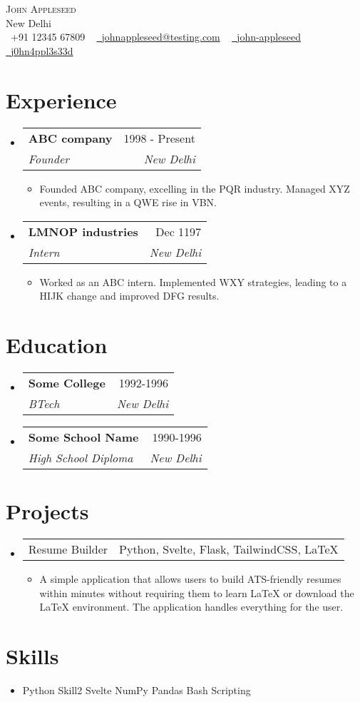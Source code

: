 \documentclass[11pt,a4paper]{article}
\makeatletter
\newcommand{\resumeItem}[1]{
  \item\small{
    {#1 \vspace{-2pt}}
  }
}
\newcommand{\resumeSubheading}[4]{
  \vspace{-2pt}\item
    \begin{tabular*}{0.97\textwidth}[t]{l@{\extracolsep{\fill}}r}
      \textbf{#1} & #2 \\
      \textit{\small#3} & \textit{\small #4} \\
    \end{tabular*}\vspace{-7pt}
}
\newcommand{\resumeProjectHeading}[2]{
    \item
    \begin{tabular*}{0.97\textwidth}{l@{\extracolsep{\fill}}r}
      \small#1 & #2 \\
    \end{tabular*}\vspace{-7pt}
}
\newcommand{\resumeSubHeadingListStart}{\begin{itemize}[leftmargin=0.15in, label={}]}
\newcommand{\resumeSubHeadingListEnd}{\end{itemize}}
\newcommand{\resumeItemListStart}{\begin{itemize}}
\newcommand{\resumeItemListEnd}{\end{itemize}\vspace{-5pt}}
\makeatother
\begin{document}
\begin{center}
    {\Huge \scshape {John Appleseed}} \\ \vspace{1pt}
    {New Delhi} \\ \vspace{1pt}
    \small \raisebox{-0.1\height}\faPhone\ {+91 12345 67809} ~ \href{mailto:johnappleseed@testing.com}{\raisebox{-0.2\height}\faEnvelope\  {johnappleseed@testing.com}} ~ 
    \href{https://linkedin.com/in/john-appleseed}{\raisebox{-0.2\height}\faLinkedin\ {john-appleseed}}  ~
    \href{https://github.com/j0hn4ppl3s33d}{\raisebox{-0.2\height}\faGithub\ {j0hn4ppl3s33d}}
\end{center}

\section{Experience}
\resumeSubHeadingListStart

        \resumeSubheading
        {ABC company}
        {1998 - Present}
        {Founder}
        {New Delhi}
        \resumeItemListStart
        \resumeItem{Founded ABC company, excelling in the PQR industry.  Managed XYZ events, resulting in a QWE rise in VBN.}
        \resumeItemListEnd

        \resumeSubheading
        {LMNOP industries}
        {Dec 1197}
        {Intern}
        {New Delhi}
        \resumeItemListStart
        \resumeItem{Worked as an ABC intern. Implemented WXY strategies, leading to a HIJK change and improved DFG results.}
        \resumeItemListEnd
\resumeSubHeadingListEnd

\section{Education}
\resumeSubHeadingListStart

        \resumeSubheading
        {Some College}
        {1992-1996}
        {BTech}
        {New Delhi}

        \resumeSubheading
        {Some School Name}
        {1990-1996}
        {High School Diploma}
        {New Delhi}
\resumeSubHeadingListEnd

\section{Projects}
\resumeSubHeadingListStart

        \resumeProjectHeading
        {Resume Builder} {Python, Svelte, Flask, TailwindCSS, LaTeX}
        \resumeItemListStart
        \resumeItem{A simple application that allows users to build ATS-friendly resumes within minutes without requiring them to learn LaTeX or download the LaTeX environment. The application handles everything for the user.}
        \resumeItemListEnd
\resumeSubHeadingListEnd

\section{Skills}
\resumeSubHeadingListStart
\item
\begin{flushleft}
Python \textbullet{}  Skill2 \textbullet{}  Svelte \textbullet{}  NumPy \textbullet{}  Pandas \textbullet{}  Bash Scripting
\end{flushleft}
\resumeSubHeadingListEnd
\end{document}
